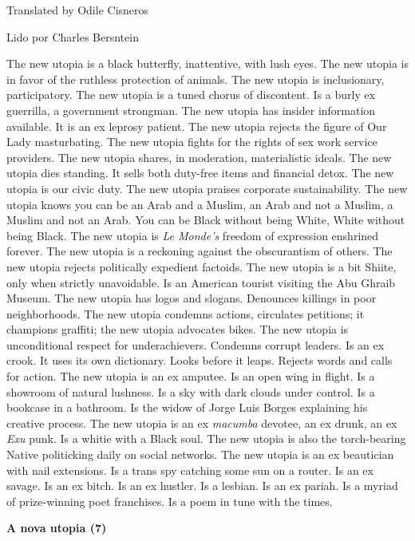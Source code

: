 Translated by Odile Cisneros

Lido por Charles Bersntein

\bigskip

The new utopia is a black butterfly, inattentive, with lush eyes. The
new utopia is in favor of the ruthless protection of animals. The new
utopia is inclusionary, participatory. The new utopia is a tuned chorus
of discontent. Is a burly ex guerrilla, a government strongman. The new
utopia has insider information available. It is an ex leprosy patient.
The new utopia rejects the figure of Our Lady masturbating. The new
utopia fights for the rights of sex work service providers. The new
utopia shares, in moderation, materialistic ideals. The new utopia dies
standing. It sells both duty-free items and financial detox. The new
utopia is our civic duty. The new utopia praises corporate
sustainability. The new utopia knows you can be an Arab and a Muslim, an
Arab and not a Muslim, a Muslim and not an Arab. You can be Black
without being White, White without being Black. The new utopia is
\emph{Le Monde's} freedom of expression enshrined forever. The new
utopia is a reckoning against the obscurantism of others. The new utopia
rejects politically expedient factoids. The new utopia is a bit Shiite,
only when strictly unavoidable. Is an American tourist visiting the Abu
Ghraib Museum. The new utopia has logos and slogans. Denounces killings
in poor neighborhoods. The new utopia condemns actions, circulates
petitions; it champions graffiti; the new utopia advocates bikes. The
new utopia is unconditional respect for underachievers. Condemns corrupt
leaders. Is an ex crook. It uses its own dictionary. Looks before it
leaps. Rejects words and calls for action. The new utopia is an ex
amputee. Is an open wing in flight. Is a showroom of natural lushness.
Is a sky with dark clouds under control. Is a bookcase in a bathroom. Is
the widow of Jorge Luis Borges explaining his creative process. The new
utopia is an ex \emph{macumba} devotee, an ex drunk, an ex \emph{Exu}
punk. Is a whitie with a Black soul. The new utopia is also the
torch-bearing Native politicking daily on social networks. The new
utopia is an ex beautician with nail extensions. Is a trans spy catching
some sun on a router. Is an ex savage. Is an ex bitch. Is an ex hustler.
Is a lesbian. Is an ex pariah. Is a myriad of prize-winning poet
franchises. Is a poem in tune with the times.

\pagebreak

\textbf{A nova utopia (7)}

